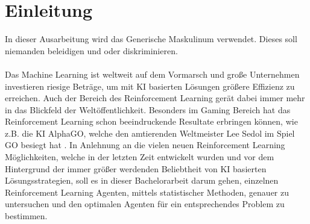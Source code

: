 \chapter{Einleitung}\label{chap:Einleitung}
In dieser Ausarbeitung wird das Generische Maskulinum verwendet. Dieses soll niemanden beleidigen und oder diskriminieren.\\
\\Das Machine Learning ist weltweit auf dem Vormarsch und große Unternehmen investieren riesige Beträge, um mit KI basierten Lösungen größere Effizienz zu erreichen. Auch der Bereich des Reinforcement Learning gerät dabei immer mehr in das Blickfeld der Weltöffentlichkeit. Besonders im Gaming Bereich hat das Reinforcement Learning schon beeindruckende Resultate erbringen können, wie z.B. die KI AlphaGO, welche den amtierenden Weltmeister Lee Sedol im Spiel GO besiegt hat \citep{UAV}. In Anlehnung an die vielen neuen Reinforcement Learning Möglichkeiten, welche in der letzten Zeit entwickelt wurden und vor dem Hintergrund der immer größer werdenden Beliebtheit von KI basierten Lösungsstrategien, soll es in dieser Bachelorarbeit darum gehen, einzelnen Reinforcement Learning Agenten, mittels statistischer Methoden, genauer zu untersuchen und den optimalen Agenten für ein entsprechendes Problem zu bestimmen.

